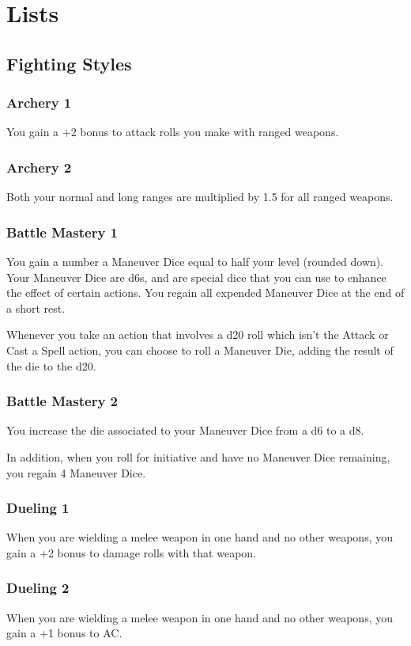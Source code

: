\section{Lists} %
\subsection*{Fighting Styles} \label{ssec::fightingstyles}
\subsubsection{Archery 1}
    You gain a +2 bonus to attack rolls you make with ranged weapons.
\subsubsection{Archery 2}
    Both your normal and long ranges are multiplied by 1.5 for all ranged weapons.
\subsubsection{Battle Mastery 1}
    You gain a number a Maneuver Dice equal to half your level (rounded down).
    Your Maneuver Dice are d6s, and are special dice that you can use to enhance the effect of certain actions.
    You regain all expended Maneuver Dice at the end of a short rest.

    Whenever you take an action that involves a d20 roll which isn't the Attack or Cast a Spell action, you can choose to roll a Maneuver Die, adding the result of the die to the d20.
\subsubsection{Battle Mastery 2}
    You increase the die associated to your Maneuver Dice from a d6 to a d8.

    In addition, when you roll for initiative and have no Maneuver Dice remaining, you regain 4 Maneuver Dice.
\subsubsection{Dueling 1}
    When you are wielding a melee weapon in one hand and no other weapons, you gain a +2 bonus to damage rolls with that weapon.
\subsubsection{Dueling 2}
    When you are wielding a melee weapon in one hand and no other weapons, you gain a +1 bonus to AC.
